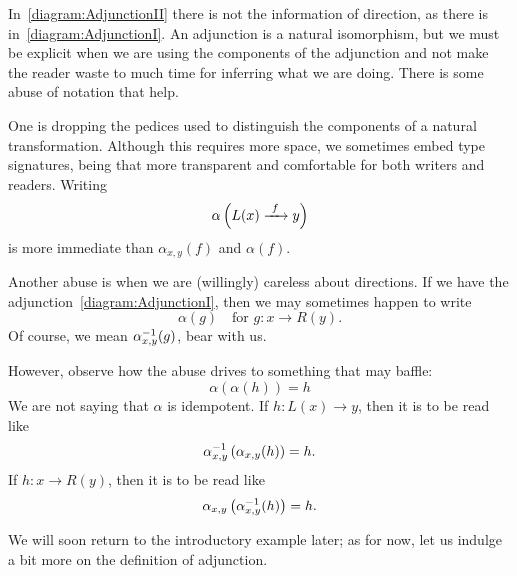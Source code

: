 \begin{remark}
  In~\eqref{diagram:AdjunctionII} there is not the information of
  direction, as there is in~\eqref{diagram:AdjunctionI}. An adjunction
  is a natural isomorphism, but we must be explicit when we are using
  the components of the adjunction and not make the reader waste to
  much time for inferring what we are doing. There is some abuse of
  notation that help.

  One is dropping the pedices used to distinguish the components of a
  natural transformation.  Although this
  requires more space, we sometimes embed type signatures, being that
  more transparent and comfortable for both writers and
  readers. Writing
%
  \[\alpha\left(L(x) \xrightarrow{\ f\ } y\right)\]
%
  is more immediate than \(\alpha_{x,y}(f)\) and \(\alpha(f)\).

  Another abuse is when we are (willingly) careless about
  directions. If we have the adjunction~\eqref{diagram:AdjunctionI},
  then we may sometimes happen to write
  \[\alpha (g) \quad\text{for } g : x \to R(y) .\]
  Of course, we mean \(\alpha^{-1}_{x,y}(g)\), bear with us.

  However, observe how the abuse drives to something that may baffle:
  \[\alpha(\alpha(h)) = h\]
  We are not saying that \(\alpha\) is idempotent. If
  \(h : L(x) \to y\), then it is to be read like
  \[\alpha^{-1}_{x, y} \left(\alpha_{x, y} (h)\right) = h .\]
  If \(h : x \to R(y)\), then it is to be read like
  \[\alpha_{x, y} \left(\alpha^{-1}_{x, y} (h)\right) = h .\]
\end{remark}

We will soon return to the introductory example later; as for now, let
us indulge a bit more on the definition of adjunction.

\newcommand\curry{\operatorname{curry}}


